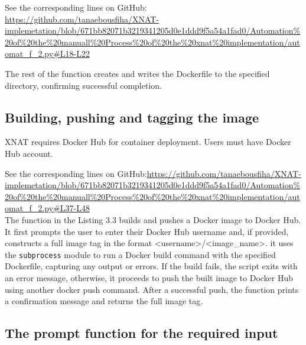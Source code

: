 \lstset{style=allblack}


\normalsize
\lstset{inputpath=en/content}



\noindent\footnotesize{ See the corresponding lines on GitHub:\url{ https://github.com/tanaebousfiha/XNAT-implemetation/blob/671bb82071b3219341205d0e1ddd9f5a54a1fad0/Automation%20of%20the%20manuall%20Process%20of%20the%20xnat%20implementation/automat_f_2.py#L18-L22}}

\normalsize


The rest of the function creates and writes the Dockerfile to the specified directory, confirming successful completion.

\subsection{Building, pushing and tagging the image}

XNAT requires Docker Hub for container deployment. Users must have Docker Hub account. 



\noindent\footnotesize See the corresponding lines on GitHub:\url{https://github.com/tanaebousfiha/XNAT-implemetation/blob/671bb82071b3219341205d0e1ddd9f5a54a1fad0/Automation%20of%20the%20manuall%20Process%20of%20the%20xnat%20implementation/automat_f_2.py#L37-L48}
\normalsize
\\
The function in the Listing 3.3 builds and pushes a Docker image to Docker Hub. It first prompts the user to enter their Docker Hub username and, if provided, constructs a full image tag in the format <username>/<image\_name>. it uses the \texttt{subprocess} module to run a Docker build command with the specified Dockerfile, capturing any output or errors. If the build fails, the script exits with an error message, otherwise, it proceeds to push the built image to Docker Hub using another docker push command. After a successful push, the function prints a confirmation message and returns the full image tag.



\subsection{The prompt function for the required input}

